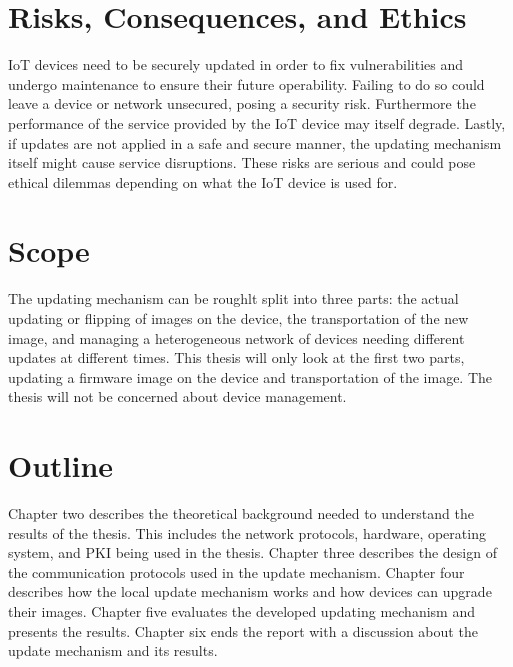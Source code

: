 \documentclass[0-thesis.tex]{subfiles}
\begin{document}
\section{Risks, Consequences, and Ethics}
IoT devices need to be securely updated in order to fix vulnerabilities and undergo
maintenance to ensure their future operability. Failing to do so could leave a device or
network unsecured, posing a security risk. Furthermore the performance of the service
provided by the IoT device may itself degrade. Lastly, if updates are not applied in a
safe and secure manner, the updating mechanism itself might cause service disruptions.
These risks are serious and could pose ethical dilemmas depending on what the IoT device
is used for.

\section{Scope}
The updating mechanism can be roughlt split into three parts: the actual updating or
flipping of images on the device, the transportation of the new image, and managing a
heterogeneous network of devices needing different updates at different times. This thesis
will only look at the first two parts, updating a firmware image on the device and
transportation of the image. The thesis will not be concerned about device management.

\section{Outline}
Chapter two describes the theoretical background needed to understand the results of the
thesis. This includes the network protocols, hardware, operating system, and PKI being
used in the thesis. Chapter three describes the design of the communication protocols used
in the update mechanism. Chapter four describes how the local update mechanism works and
how devices can upgrade their images. Chapter five evaluates the developed updating
mechanism and presents the results. Chapter six ends the report with a discussion about
the update mechanism and its results.
\end{document}
